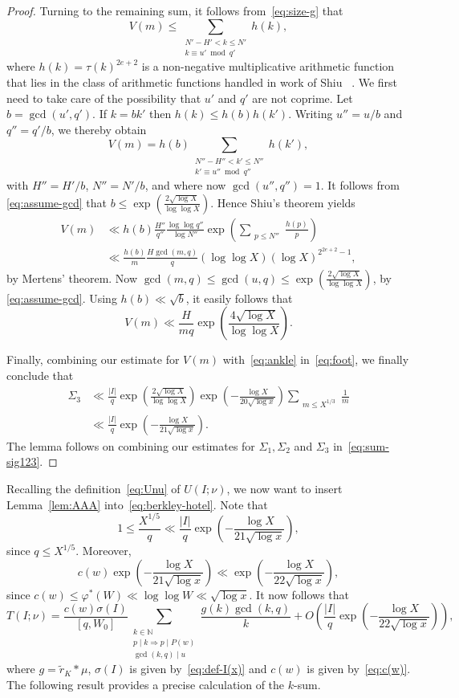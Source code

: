 \documentclass[11pt,letterpaper]{amsart}
\renewcommand{\leq}{\leqslant}
\theoremstyle{definition}
\numberwithin{equation}{section}
\newcommand\NN{\mathbb{N}}
\newcommand{\0}{\mathbf{0}}
\begin{document}
\begin{proof}
Turning to the remaining sum, it follows from~\eqref{eq:size-g} that 
$$
V(m)\leq 
\sum_{\substack{N'-H'<k\leq N'\\
k\equiv u'\bmod{q'}
}} 
h(k),
$$
where
$h(k)=\tau(k)^{2e+2}$ is a non-negative multiplicative arithmetic function that lies in the class of 
arithmetic functions handled in work of  Shiu ~\cite[Thm.~1]{shiu}. 
We first need to take care of the possibility that $u'$ and $q'$ are not coprime. Let $b=\gcd(u',q')$. If $k=bk'$ then $h(k)\leq h(b)h(k')$. Writing
$u''=u/b$ and $q''=q'/b$, 
we thereby obtain
$$
V(m)=
h(b)\sum_{\substack{N''-H''<k'\leq N''\\
k'\equiv u''\bmod{q''}
}} h(k'),
$$
with $H''=H'/b$, $N''=N'/b$, and where now $\gcd(u'',q'')=1$. It follows from 
\eqref{eq:assume-gcd} that 
$
b\leq \exp(\frac{2\sqrt{\log X}}{\log\log X}).$
Hence Shiu's theorem yields
\begin{align*}
V(m)
&\ll h(b)
 \frac{H''}{q''} \frac{\log\log q''}{\log N''} \exp\left(\sum_{\substack{p\leq N''}} \frac{h(p)}{p}\right)\\
&\ll \frac{h(b)}{m}
 \frac{H\gcd(m,q)}{q} (\log\log X) (\log X)^{2^{2e+2}-1},
\end{align*}
by Mertens' theorem. 
Now $\gcd(m,q)\leq \gcd(u,q)
\leq \exp(\frac{2\sqrt{\log X}}{\log\log X})$, by 
\eqref{eq:assume-gcd}.
Using $h(b)\ll \sqrt{b}$, it easily follows that 
$$
V(m)\ll 
  \frac{H}{mq}  \exp\left(\frac{4\sqrt{\log X}}{\log\log X}\right).
$$

Finally, 
combining our estimate for $V(m)$ with~\eqref{eq:ankle} in~\eqref{eq:foot}, we finally conclude that
\begin{align*}
\Sigma_3
&\ll \frac{|I|}{q} \exp\left(\frac{2\sqrt{\log X}}{\log\log X}\right)
  \exp\left(-\frac{\log X}{20\sqrt{\log x}}\right)\sum_{\substack{m\leq X^{1/3}}}
  \frac{1}{m}\\
&\ll   \frac{|I|}{q} 
  \exp\left(-\frac{\log X}{21\sqrt{\log x}}\right).
  \end{align*}
The  lemma follows on combining our estimates for $\Sigma_1, \Sigma_2$ and $\Sigma_3$ in~\eqref{eq:sum-sig123}.
\end{proof}


Recalling the definition~\eqref{eq:Unu} of $U(I;\nu)$, 
we now want to insert  Lemma~\ref{lem:AAA} 
into~\eqref{eq:berkley-hotel}. Note that 
$$
1\leq \frac{X^{1/5}}{q }\ll \frac{|I|}{q} 
\exp\left(-\frac{\log X}{21\sqrt{\log x}} \right),
$$
since $q\leq X^{1/5}$. 
Moreover, 
$$
c(w)\exp\left(-\frac{\log X}{21\sqrt{\log x}} \right)
\ll
\exp\left(-\frac{\log X}{22\sqrt{\log x}} \right),
$$
since $c(w)\leq \varphi^*(W)\ll \log\log  W\ll \sqrt{\log x}$. 
It now follows that 
\begin{equation}\label{eq:sirius*}
T(I;\nu)= 
\frac{c(w)\sigma(I)}{[q,W_0]} 
\sum_{\substack{k\in \NN\\
p\mid k \Rightarrow p \mid P(w)\\
\gcd(k,q)\mid u}} 
\frac{g(k)\gcd(k,q) }{k}
+
O\left(\frac{|I|}{q}
\exp\left(-\frac{\log X}{22\sqrt{\log x}} \right)\right),
\end{equation}
where $g=\tilde r_K*\mu$, $\sigma(I)$ is given by~\eqref{eq:def-I(x)}
and $c(w)$ is given by~\eqref{eq:c(w)}.  
The following result provides a precise  calculation of the 
$k$-sum. 
\end{document}
